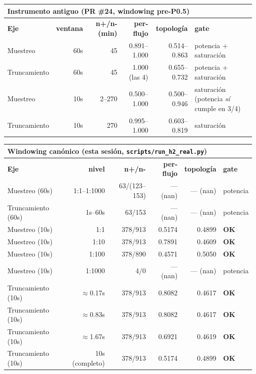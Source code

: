 \documentclass[11pt]{article}
\newcommand{\code}[1]{\texttt{\small #1}}
\begin{document}
\begin{center}
\small
\begin{tabular}{@{}lrrrrl@{}}
\multicolumn{6}{l}{\textbf{Instrumento antiguo (PR \#24, windowing pre-P0.5)}} \\
\toprule
\textbf{Eje} & \textbf{ventana} & \textbf{n+/n- (min)} & \textbf{per-flujo} & \textbf{topología} & \textbf{gate} \\
\midrule
Muestreo    & 60s & 45 & 0.891--1.000 & 0.514--0.863 & potencia + saturación \\
Truncamiento & 60s & 45 & 1.000 (las 4) & 0.655--0.732 & potencia + saturación \\
Muestreo    & 10s & 2--270 & 0.500--1.000 & 0.500--0.946 & saturación (potencia \emph{sí} cumple en 3/4) \\
Truncamiento & 10s & 270 & 0.995--1.000 & 0.603--0.819 & saturación \\
\bottomrule
\end{tabular}

\vspace{0.6em}

\begin{tabular}{@{}lrrrrl@{}}
\multicolumn{6}{l}{\textbf{Windowing canónico (esta sesión, \code{scripts/run\_h2\_real.py})}} \\
\toprule
\textbf{Eje} & \textbf{nivel} & \textbf{n+/n-} & \textbf{per-flujo} & \textbf{topología} & \textbf{gate} \\
\midrule
Muestreo (60s)    & 1:1--1:1000 & 63/(123--153) & --- (nan) & --- (nan) & potencia \\
Truncamiento (60s) & 1s--60s    & 63/153        & --- (nan) & --- (nan) & potencia \\
Muestreo (10s)    & 1:1   & 378/913 & 0.5174 & 0.4899 & \textbf{OK} \\
Muestreo (10s)    & 1:10  & 378/913 & 0.7891 & 0.4609 & \textbf{OK} \\
Muestreo (10s)    & 1:100 & 378/890 & 0.4571 & 0.5050 & \textbf{OK} \\
Muestreo (10s)    & 1:1000 & 4/0    & --- (nan) & --- (nan) & potencia \\
Truncamiento (10s) & $\approx$0.17s & 378/913 & 0.8082 & 0.4617 & \textbf{OK} \\
Truncamiento (10s) & $\approx$0.83s & 378/913 & 0.8082 & 0.4617 & \textbf{OK} \\
Truncamiento (10s) & $\approx$1.67s & 378/913 & 0.6921 & 0.4619 & \textbf{OK} \\
Truncamiento (10s) & 10s (completo) & 378/913 & 0.5174 & 0.4899 & \textbf{OK} \\
\bottomrule
\end{tabular}
\end{center}
\end{document}
